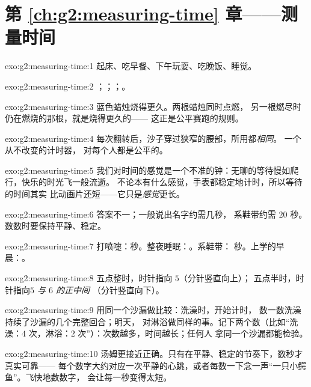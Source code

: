 \section*{第 \ref{ch:g2:measuring-time} 章——测量时间}

\begin{solution}{exo:g2:measuring-time:1}
起床、吃早餐、下午玩耍、吃晚饭、睡觉。
\end{solution}

\begin{solution}{exo:g2:measuring-time:2}
；；；。
\end{solution}

\begin{solution}{exo:g2:measuring-time:3}
蓝色蜡烛烧得更久。两根蜡烛同时点燃，
另一根燃尽时仍在燃烧的那根，就是烧得更久的——
这正是公平赛跑的规则。
\end{solution}

\begin{solution}{exo:g2:measuring-time:4}
每次翻转后，沙子穿过狭窄的腰部，所用都\emph{相同}。
一个从不改变的计时器，
对每个人都是公平的。
\end{solution}

\begin{solution}{exo:g2:measuring-time:5}
我们对时间的感觉是一个不准的钟：无聊的等待慢如爬行，快乐的时光飞一般流逝。
不论本有什么感觉，手表都稳定地计时，所以等待的时间其实
比动画片还短——它只是\emph{感觉}更长。
\end{solution}

\begin{solution}{exo:g2:measuring-time:6}
答案不一；一般说出名字约需几秒，
系鞋带约需 $20$ 秒。数数时要保持平静、稳定。
\end{solution}

\begin{solution}{exo:g2:measuring-time:7}
打喷嚏：秒。整夜睡眠：。系鞋带：
秒。上学的早晨：。
\end{solution}

\begin{solution}{exo:g2:measuring-time:8}
五点整时，时针指向 $5$（分针竖直向上）；
五点半时，时针指向\emph{$5$ 与 $6$ 的正中间}
（分针竖直向下）。
\end{solution}

\begin{solution}{exo:g2:measuring-time:9}
用同一个沙漏做比较：洗澡时，开始计时，
数一数洗澡持续了沙漏的几个完整回合；明天，
对淋浴做同样的事。记下两个数（比如“洗澡：$4$
次，淋浴：$2$ 次”）：次数越多，时间越长；任何人
拿同一个沙漏都能检验。
\end{solution}

\begin{solution}{exo:g2:measuring-time:10}
汤姆更接近正确。只有在平静、稳定的节奏下，数秒才真实可靠——
每个数字大约对应一次平静的心跳，或者每数一下念一声“一只小鳄
鱼”。飞快地数数字，
会让每一秒变得太短。
\end{solution}
